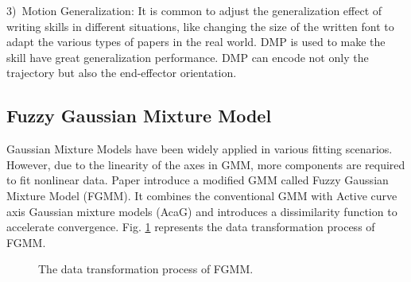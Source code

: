 \documentclass[journal]{IEEEtran}
\begin{document}
3)~Motion Generalization: It is common to adjust the generalization effect of writing skills in different situations, like changing the size of the written font to adapt the various types of papers in the real world. DMP is used to make the skill have great generalization performance. DMP can encode not only the trajectory but also the end-effector orientation.

\subsection{Fuzzy Gaussian Mixture Model}
Gaussian Mixture Models have been widely applied in various fitting scenarios. However, due to the linearity of the axes in GMM, more components are required to fit nonlinear data. Paper \cite{Ju2012} introduce a modified GMM called Fuzzy Gaussian Mixture Model (FGMM). It combines the conventional GMM with Active curve axis Gaussian mixture models (AcaG)\cite{Zhang2005} and introduces a dissimilarity function to accelerate convergence. Fig. \ref{fig2} represents the data transformation process of FGMM.
\begin{figure}[!t]
    \centering
    \quad
    \caption{The data transformation process of FGMM.}
    \label{fig2}
\end{figure}
\end{document}
